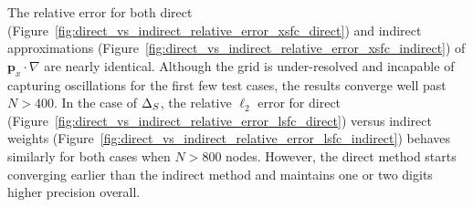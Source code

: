 The relative error for both direct (Figure~\ref{fig:direct_vs_indirect_relative_error_xsfc_direct}) and indirect approximations (Figure~\ref{fig:direct_vs_indirect_relative_error_xsfc_indirect}) of $\mathbf{p}_{x} \cdot \nabla$ are nearly identical. Although the grid is under-resolved and incapable of capturing oscillations for the first few test cases, the results converge well past $N > 400$. In the case of $\Delta_S$, the relative $\ell_2$ error for direct (Figure~\ref{fig:direct_vs_indirect_relative_error_lsfc_direct}) versus indirect weights (Figure~\ref{fig:direct_vs_indirect_relative_error_lsfc_indirect}) behaves similarly for both cases when $N > 800$ nodes. However, the direct method starts converging earlier than the indirect method and maintains one or two digits higher precision overall. %

